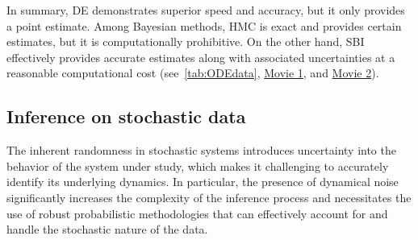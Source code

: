 \documentclass[preprint,11pt,authoryear]{elsarticle}
\begin{document}
In summary, DE demonstrates superior speed and accuracy, but it only provides a point estimate. Among Bayesian methods, HMC is exact and provides certain estimates, but it is computationally prohibitive. On the other hand, SBI effectively provides accurate estimates along with associated uncertainties at a reasonable computational cost (see~\autoref{tab:ODEdata},  \href{run:https://github.com/ins-amu/Inference_MFM/blob/main/Videos/Movie1_MPR_ODE_HMC_RV.mp4}{Movie 1}, and  \href{run:https://github.com/ins-amu/Inference_MFM/blob/main/Videos/Movie2_MPR_ODE_SBI_RV.mp4}{Movie 2}). 



\subsection{Inference on stochastic data}

The inherent randomness in stochastic systems introduces uncertainty into the behavior of the system under study, which makes it challenging to accurately identify its underlying dynamics. In particular, the presence of dynamical noise significantly increases the complexity of the inference process and necessitates the use of robust probabilistic methodologies that can effectively account for and handle the stochastic nature of the data. 
\end{document}
